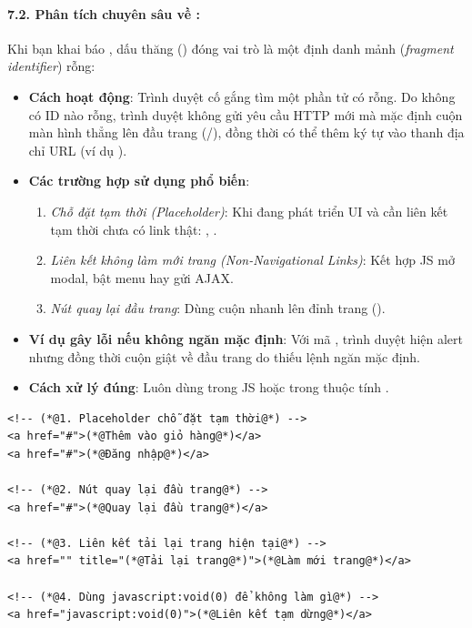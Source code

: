 \paragraph{7.2. Phân tích chuyên sâu về :}
Khi bạn khai báo , dấu thăng (\codeinline{\#}) đóng vai trò là một định danh mảnh (\textit{fragment identifier}) rỗng:
\begin{itemize}[leftmargin=1.5em, itemsep=3pt, parsep=0pt]
    \item \textbf{Cách hoạt động}: Trình duyệt cố gắng tìm một phần tử có  rỗng. Do không có ID nào rỗng, trình duyệt không gửi yêu cầu HTTP mới mà mặc định cuộn màn hình thẳng lên đầu trang (/), đồng thời có thể thêm ký tự \codeinline{\#} vào thanh địa chỉ URL (ví dụ ).
    \item \textbf{Các trường hợp sử dụng phổ biến}: 
    \begin{enumerate}[leftmargin=1.2em, itemsep=2pt, parsep=0pt]
        \item \textit{Chỗ đặt tạm thời (Placeholder)}: Khi đang phát triển UI và cần liên kết tạm thời chưa có link thật: , .
        \item \textit{Liên kết không làm mới trang (Non-Navigational Links)}: Kết hợp JS mở modal, bật menu hay gửi AJAX.
        \item \textit{Nút quay lại đầu trang}: Dùng cuộn nhanh lên đỉnh trang ().
    \end{enumerate}
    \item \textbf{Ví dụ gây lỗi nếu không ngăn mặc định}: Với mã , trình duyệt hiện alert nhưng đồng thời cuộn giật về đầu trang do thiếu lệnh ngăn mặc định.
    \item \textbf{Cách xử lý đúng}: Luôn dùng  trong JS hoặc  trong thuộc tính .
\end{itemize}

\begin{codeWindow}
\begin{lstlisting}[language=HTML5]
<!-- (*@1. Placeholder chỗ đặt tạm thời@*) -->
<a href="#">(*@Thêm vào giỏ hàng@*)</a>
<a href="#">(*@Đăng nhập@*)</a>

<!-- (*@2. Nút quay lại đầu trang@*) -->
<a href="#">(*@Quay lại đầu trang@*)</a>

<!-- (*@3. Liên kết tải lại trang hiện tại@*) -->
<a href="" title="(*@Tải lại trang@*)">(*@Làm mới trang@*)</a>

<!-- (*@4. Dùng javascript:void(0) để không làm gì@*) -->
<a href="javascript:void(0)">(*@Liên kết tạm dừng@*)</a>
\end{lstlisting}
\end{codeWindow}

